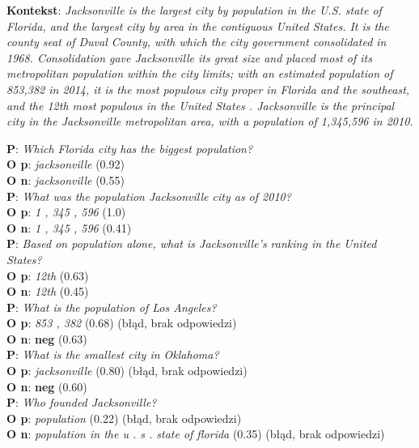 
\setlength{\abovedisplayskip}{20pt}
\setlength{\belowdisplayskip}{20pt}

\small
\noindent
\textbf{Kontekst}:
\textit{Jacksonville is the largest city by population in the U.S. state of Florida, and the largest city by area in the contiguous United States. It is the county seat of Duval County, with which the city government consolidated in 1968. Consolidation gave Jacksonville its great size and placed most of its metropolitan population within the city limits; with an estimated population of 853,382 in 2014, it is the most populous city proper in Florida and the southeast, and the 12th most populous in the United States . Jacksonville is the principal city in the Jacksonville metropolitan area, with a population of 1,345,596 in 2010. }

\noindent
\textbf{P}: \textit{Which Florida city has the biggest population?}\\
\textbf{O p}: \textit{jacksonville} (0.92)\\
\textbf{O n}: \textit{jacksonville} (0.55)\\[5pt]
\textbf{P}: \textit{What was the population Jacksonville city as of 2010?}\\
\textbf{O p}: \textit{1 , 345 , 596} (1.0)\\
\textbf{O n}: \textit{1 , 345 , 596} (0.41)\\[5pt]
\textbf{P}: \textit{Based on population alone, what is Jacksonville's ranking in the United States?}\\
\textbf{O p}: \textit{12th} (0.63)\\
\textbf{O n}: \textit{12th} (0.45)\\[10pt]
\textbf{P}: \textit{What is the population of Los Angeles?}\\
\textbf{O p}: \textit{853 , 382} (0.68) (błąd, brak odpowiedzi)\\
\textbf{O n}: \textbf{neg} (0.63)\\[5pt]
\textbf{P}: \textit{What is the smallest city in Oklahoma?}\\
\textbf{O p}: \textit{jacksonville} (0.80) (błąd, brak odpowiedzi)\\
\textbf{O n}: \textbf{neg} (0.60)\\[5pt]
\textbf{P}: \textit{Who founded Jacksonville?}\\
\textbf{O p}: \textit{population} (0.22) (błąd, brak odpowiedzi)\\
\textbf{O n}: \textit{population in the u . s . state of florida} (0.35) (błąd, brak odpowiedzi)

